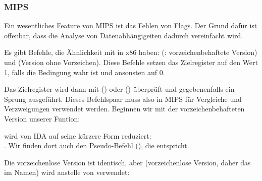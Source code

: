 \subsubsection{MIPS}
Ein wesentliches Feature von MIPS ist das Fehlen von Flags.
Der Grund dafür ist offenbar, dass die Analyse von Datenabhängigeiten dadurch vereinfacht wird.

Es gibt Befehle, die Ähnlichkeit mit  in x86 haben: (: vorzeichenbehaftete
Version) und  (Version ohne Vorzeichen).
Diese Befehle setzen das Zielregister auf den Wert 1, falls die Bedingung wahr ist und ansonsten auf 0.

Das Zielregister wird dann mit  () oder  () überprüft und
gegebenenfalls ein Sprung ausgeführt. 
Dieses Befehlspaar muss also in MIPS für Vergleiche und Verzweigungen verwendet werden.
Beginnen wir mit der vorzeichenbehafteten Version unserer Funtion:



 wird von IDA auf seine kürzere Form reduziert:\\
.
Wir finden dort auch den Pseudo-Befehl  (), die 
entspricht.

Die vorzeichenlose Version ist identisch, aber  (vorzeichenlose Version, daher das  im Namen) wird
anstelle von  verwendet:



